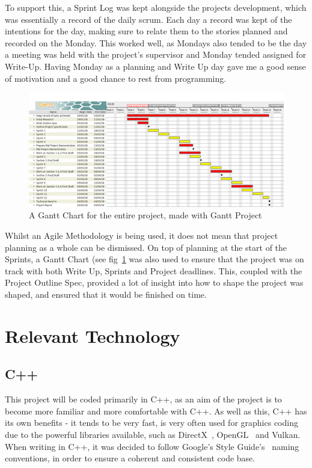 \documentclass[a4paper,10pt]{report}
\begin{document}
To support this, a Sprint Log was kept alongside the projects development, which was essentially a record of the daily scrum. Each day a record was kept of the intentions for the day, making sure to relate them to the stories planned and recorded on the Monday. This worked well, as Mondays also tended to be the day a meeting was held with the project's supervisor and Monday tended assigned for Write-Up. Having Monday as a planning and Write Up day gave me a good sense of motivation and a good chance to rest from programming. \medskip

\begin{figure}[h!]
    \centering
  \includegraphics[width=1\textwidth]{GanttChart.png}
 \caption{A Gantt Chart for the entire project, made with Gantt Project~\cite{gantt}}
 \label{fig:gantt_chart}
\end{figure}


Whilst an Agile Methodology is being used, it does not mean that project planning as a whole can be dismissed. On top of planning at the start of the Sprints, a Gantt Chart (see fig~\ref{fig:gantt_chart} was also used to ensure that the project was on track with both Write Up, Sprints and Project deadlines. This, coupled with the Project Outline Spec, provided a lot of insight into how to shape the project was shaped, and ensured that it would be finished on time. \medskip


\section{Relevant Technology}

\subsection{C++}

This project will be coded primarily in C++, as an aim of the project is to become more familiar and more comfortable with C++. As well as this, C++ has its own benefits - it tends to be very fast, is very often used for graphics coding due to the powerful libraries available, such as DirectX~\cite{directx_website}, OpenGL~\cite{OpenGL_website} and Vulkan. When writing in C++, it was decided to follow Google's Style Guide's~\cite{google_c_style_guide} naming conventions, in order to ensure a coherent and consistent code base.
\end{document}
